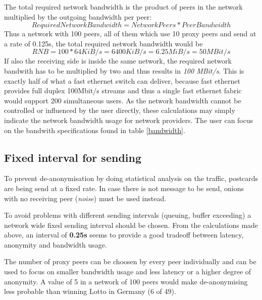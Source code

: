 The total required network bandwidth is the product of peers in the
network multiplied by the outgoing bandwidth per peer:
$$Required Network Bandwidth = Network Peers * Peer Bandwidth$$
Thus a network with 100 peers, all of them which use 10 proxy peers
and send at a rate of 0.125s, the total required network bandwidth would be
$$RNB = 100 * 64 KiB/s = 6400 KiB/s = 6.25MiB/s = 50 MBit/s$$
If also the receiving side is inside the same network, the required network
bandwith has to be multiplied by two and thus results in 
\textit{100 MBit/s}. This is exactly half of what a fast ethernet switch
can deliver, because fast ethernet provides full duplex 100Mbit/s streams
and thus a single fast ethernet fabric would support 200 simultaneous users.
As the network bandwidth cannot be controlled or influenced by the user
directly, these calculations may simply indicate the network bandwidth
usage for network providers. The user can focus on the bandwith specifications
found in table \ref{bandwidth}.
\subsection{Fixed interval for sending}
To prevent de-anonymisation by doing statistical analysis on the traffic,
postcards are being send at a fixed rate.
In case there is not message to be send, onions with no receiving
peer (\textit{noise}) must be used instead.

To avoid problems with different sending intervals
(queuing, buffer exceeding) a network wide fixed sending interval
should be chosen. From the calculations made above, an interval
of \textbf{0.25s} seems to provide a good tradeoff between
latency, anonymity and bandwidth usage.

The number of proxy peers can be choosen by every peer individually
and can be used to focus on smaller bandwidth usage and less latency
or a higher degree of anonymity. A value of 5 in a network of 100 peers
would make de-anonymising less probable than winning Lotto in Germany
(6 of 49).
